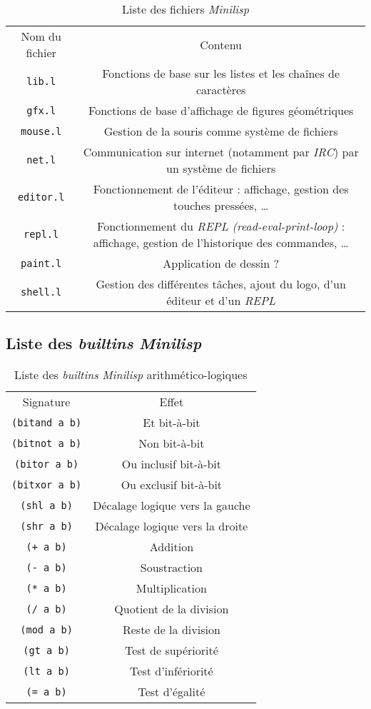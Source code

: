\documentclass[a4paper, 10pt, french]{article}
\newcommand{\codeLisp}[1]{\texttt{#1}}
\newcommand{\code}[1]{\texttt{#1}}
\newcommand{\foreign}[1]{\emph{#1}}
\begin{document}
\begin{table}[H]
  \centering
  \begin{tabularx}{\linewidth}{|C|C|}
    \hline
    Nom du fichier & Contenu \tabularnewline
    \hhline{|=|=|}
    \code{lib.l} & Fonctions de base sur les listes et les chaînes de caractères \tabularnewline
    \hline
    \code{gfx.l} & Fonctions de base d'affichage de figures géométriques \tabularnewline
    \hhline{|=|=|}
    \code{mouse.l} & Gestion de la souris comme système de fichiers \tabularnewline
    \hline
    \code{net.l} & Communication sur internet (notamment par \foreign{IRC}) par un système de fichiers \tabularnewline
    \hhline{|=|=|}
    \code{editor.l} & Fonctionnement de l'éditeur : affichage, gestion des touches pressées, \ldots \tabularnewline
    \hline
    \code{repl.l} & Fonctionnement du \foreign{REPL (read-eval-print-loop)} : affichage, gestion de l'historique des commandes, \ldots \tabularnewline
    \hline
    \code{paint.l} & Application de dessin ? \tabularnewline
    \hhline{|=|=|}
    \code{shell.l} & Gestion des différentes tâches, ajout du logo, d'un éditeur et d'un \foreign{REPL} \tabularnewline
    \hline
  \end{tabularx}
  \caption{Liste des fichiers \foreign{Minilisp}}
\end{table}

\subsection{Liste des \foreign{builtins} \foreign{Minilisp}}

\begin{table}[H]
  \centering
  \begin{tabularx}{\linewidth}{|C|C|}
    \hline
    Signature & Effet \tabularnewline
    \hhline{|=|=|}
    \codeLisp{(bitand a b)} & Et bit-à-bit \tabularnewline
    \hline
    \codeLisp{(bitnot a b)} & Non bit-à-bit \tabularnewline
    \hline
    \codeLisp{(bitor a b)} & Ou inclusif bit-à-bit \tabularnewline
    \hline
    \codeLisp{(bitxor a b)} & Ou exclusif bit-à-bit \tabularnewline
    \hhline{|=|=|}
    \codeLisp{(shl a b)} & Décalage logique vers la gauche \tabularnewline
    \hline
    \codeLisp{(shr a b)} & Décalage logique vers la droite \tabularnewline
    \hhline{|=|=|}
    \codeLisp{(+ a b)} & Addition \tabularnewline
    \hline
    \codeLisp{(- a b)} & Soustraction \tabularnewline
    \hline
    \codeLisp{(* a b)} & Multiplication \tabularnewline
    \hline
    \codeLisp{(/ a b)} & Quotient de la division \tabularnewline
    \hline
    \codeLisp{(mod a b)} & Reste de la division \tabularnewline
    \hhline{|=|=|}
    \codeLisp{(gt a b)} & Test de supériorité \tabularnewline
    \hline
    \codeLisp{(lt a b)} & Test d'infériorité \tabularnewline
    \hline
    \codeLisp{(= a b)} & Test d'égalité \tabularnewline
    \hline
  \end{tabularx}
  \caption{Liste des \foreign{builtins} \foreign{Minilisp} arithmético-logiques}
\end{table}
\end{document}
